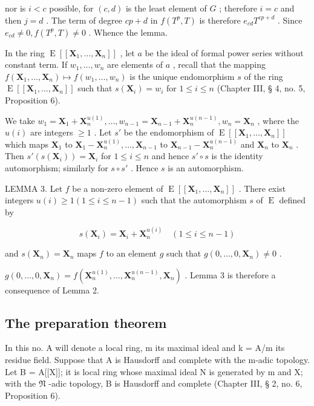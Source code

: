 nor is \(i < c\) possible, for \((c, d)\) is the least element of \(G\) ; therefore \(i = c\) and then \(j = d\) . The term of degree \(cp + d\) in \(f(T^p, T)\) is therefore \(e_{cd}T^{cp + d}\) . Since \(e_{cd} \neq 0, f(T^p, T) \neq 0\) . Whence the lemma.

In the ring \(\operatorname{E}[[\mathbf{X}_1, \ldots, \mathbf{X}_n]]\) , let \(a\) be the ideal of formal power series without constant term. If \(w_1, \ldots, w_n\) are elements of \(a\) , recall that the mapping \(f(\mathbf{X}_1, \ldots, \mathbf{X}_n) \mapsto f(w_1, \ldots, w_n)\) is the unique endomorphism \(s\) of the ring \(\operatorname{E}[[\mathbf{X}_1, \ldots, \mathbf{X}_n]]\) such that \(s(\mathbf{X}_i) = w_i\) for \(1 \leqslant i \leqslant n\) (Chapter III, § 4, no. 5, Proposition 6).

We take \(w_1 = \mathbf{X}_1 + \mathbf{X}_n^{u(1)}, \ldots, w_{n-1} = \mathbf{X}_{n-1} + \mathbf{X}_n^{u(n-1)}, w_n = \mathbf{X}_n\) , where the \(u(i)\) are integers \(\geqslant 1\) . Let \(s'\) be the endomorphism of \(\operatorname{E}[[\mathbf{X}_1, \ldots, \mathbf{X}_n]]\) which maps \(\mathbf{X}_1\) to \(\mathbf{X}_1 - \mathbf{X}_n^{u(1)}, \ldots, \mathbf{X}_{n-1}\) to \(\mathbf{X}_{n-1} - \mathbf{X}_n^{u(n-1)}\) and \(\mathbf{X}_n\) to \(\mathbf{X}_n\) . Then \(s'(s(\mathbf{X}_i)) = \mathbf{X}_i\) for \(1 \leqslant i \leqslant n\) and hence \(s' \circ s\) is the identity automorphism; similarly for \(s \circ s'\) . Hence \(s\) is an automorphism.

LEMMA 3. Let \(f\) be a non-zero element of \(\operatorname{E}[[\mathbf{X}_1, \ldots, \mathbf{X}_n]]\) . There exist integers \(u(i) \geqslant 1 (1 \leqslant i \leqslant n - 1)\) such that the automorphism \(s\) of \(\operatorname{E}\) defined by

\[
s (\mathbf {X} _ {i}) = \mathbf {X} _ {i} + \mathbf {X} _ {n} ^ {u (i)} \quad (1 \leqslant i \leqslant n - 1)
\]

and \(s(\mathbf{X}_n) = \mathbf{X}_n\) maps \(f\) to an element \(g\) such that \(g(0, \ldots, 0, \mathbf{X}_n) \neq 0\) .

\(g(0,\ldots,0,\mathbf{X}_n) = f(\mathbf{X}_n^{u(1)},\ldots ,\mathbf{X}_n^{u(n - 1)},\mathbf{X}_n)\) . Lemma 3 is therefore a consequence of Lemma 2.

\subsection{The preparation theorem}

In this no. A will denote a local ring, m its maximal ideal and k = A/m its residue field. Suppose that A is Hausdorff and complete with the m-adic topology. Let B = A{[}{[}X{]}{]}; it is local ring whose maximal ideal N is generated by m and X; with the \(\mathfrak{N}\) -adic topology, B is Hausdorff and complete (Chapter III, § 2, no. 6, Proposition 6).


